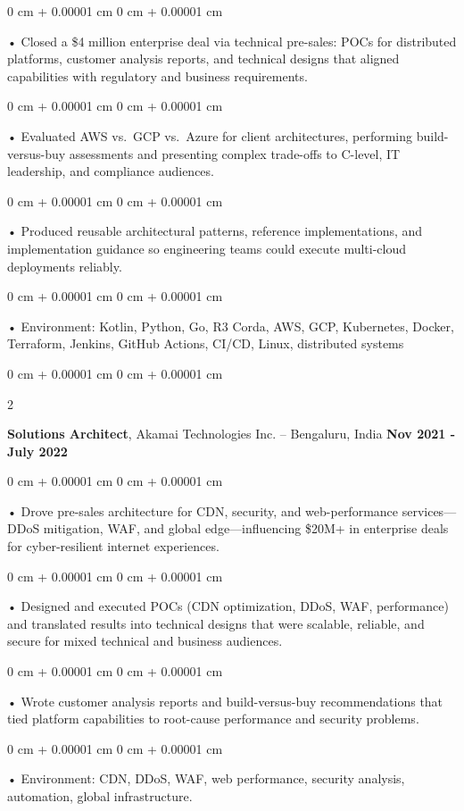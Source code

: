\documentclass[10pt, letterpaper]{article}
\newenvironment{onecolentry}{
    \begin{adjustwidth}{
        0 cm + 0.00001 cm
    }{
        0 cm + 0.00001 cm
    }
}{
    \end{adjustwidth}
} %
\newenvironment{twocolentry}[2][]{
    \onecolentry
    \def\secondColumn{#2}
    \setcolumnwidth{\fill, 4.5 cm}
    \begin{paracol}{2}
}{
    \switchcolumn \raggedleft \secondColumn
    \end{paracol}
    \endonecolentry
} %
\begin{document}
        \begin{onecolentry}
             • Closed a \$4 million enterprise deal via technical pre-sales: POCs for distributed platforms, customer analysis reports, and technical designs that aligned capabilities with regulatory and business requirements.
        \end{onecolentry}
        \begin{onecolentry}
             • Evaluated AWS vs.\ GCP vs.\ Azure for client architectures, performing build-versus-buy assessments and presenting complex trade-offs to C-level, IT leadership, and compliance audiences.
        \end{onecolentry}
        \begin{onecolentry}
             • Produced reusable architectural patterns, reference implementations, and implementation guidance so engineering teams could execute multi-cloud deployments reliably.
        \end{onecolentry}

        \begin{onecolentry}
             • Environment: Kotlin, Python, Go, R3 Corda, AWS, GCP, Kubernetes, Docker, Terraform, Jenkins, GitHub Actions, CI/CD, Linux, distributed systems
        \end{onecolentry}
        \vspace{0.1cm}

        \begin{twocolentry}{
            \textbf{Nov 2021 - July 2022}
        }
            \textbf{Solutions Architect}, Akamai Technologies Inc. -- Bengaluru, India \end{twocolentry}
        \begin{onecolentry}
            • Drove pre-sales architecture for CDN, security, and web-performance services---DDoS mitigation, WAF, and global edge---influencing \$20M+ in enterprise deals for cyber-resilient internet experiences.
        \end{onecolentry}
        \begin{onecolentry}
            • Designed and executed POCs (CDN optimization, DDoS, WAF, performance) and translated results into technical designs that were scalable, reliable, and secure for mixed technical and business audiences.
        \end{onecolentry}
        \begin{onecolentry}
             • Wrote customer analysis reports and build-versus-buy recommendations that tied platform capabilities to root-cause performance and security problems.
        \end{onecolentry}
        \begin{onecolentry}
             • Environment: CDN, DDoS, WAF, web performance, security analysis, automation, global infrastructure.
        \end{onecolentry}
\end{document}
